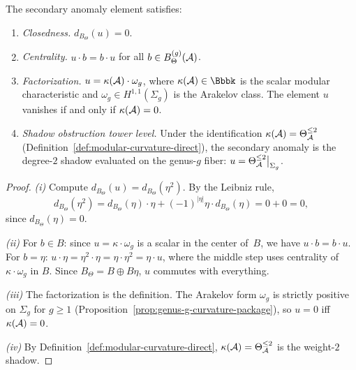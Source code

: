 \begin{proposition}
\label{prop:secondary-anomaly-properties}
The secondary anomaly element satisfies:
\begin{enumerate}[label=\textup{(\roman*)}]
\item \emph{Closedness.}\; $d_{B_\Theta}(u) = 0$.

\item \emph{Centrality.}\; $u \cdot b = b \cdot u$ for all $b \in
B_\Theta^{(g)}(\mathcal{A})$.

\item \emph{Factorization.}\; $u = \kappa(\mathcal{A}) \cdot \omega_g$, where
$\kappa(\cA) \in \Bbbk$ is the scalar modular characteristic and
$\omega_g \in H^{1,1}(\Sigma_g)$ is the Arakelov class. The element
$u$ vanishes if and only if $\kappa(\mathcal{A}) = 0$.

\item \emph{Shadow obstruction tower level.}\; Under the identification
$\kappa(\mathcal{A}) = \Theta_{\mathcal{A}}^{\leq 2}$
(Definition~\ref{def:modular-curvature-direct}), the
secondary anomaly is the degree-$2$ shadow evaluated on the genus-$g$
fiber: $u = \Theta_{\mathcal{A}}^{\leq 2}\big|_{\Sigma_g}$.
\end{enumerate}
\end{proposition}

\begin{proof}
\emph{(i)} Compute $d_{B_\Theta}(u) = d_{B_\Theta}(\eta^2)$. By the
Leibniz rule,
\[
d_{B_\Theta}(\eta^2) = d_{B_\Theta}(\eta) \cdot \eta
+ (-1)^{|\eta|}\eta \cdot d_{B_\Theta}(\eta) = 0 + 0 = 0,
\]
since $d_{B_\Theta}(\eta) = 0$.

\emph{(ii)} For $b \in B$: since $u = \kappa \cdot \omega_g$ is a
scalar in the center of~$B$, we have $u \cdot b = b \cdot u$. For
$b = \eta$: $u \cdot \eta = \eta^2 \cdot \eta = \eta \cdot \eta^2 =
\eta \cdot u$, where the middle step uses centrality of
$\kappa \cdot \omega_g$ in $B$. Since $B_\Theta = B \oplus B\eta$,
$u$ commutes with everything.

\emph{(iii)} The factorization is the definition. The Arakelov form
$\omega_g$ is strictly positive on $\Sigma_g$ for $g \geq 1$
(Proposition~\ref{prop:genus-g-curvature-package}), so $u = 0$
iff $\kappa(\mathcal{A}) = 0$.

\emph{(iv)} By Definition~\ref{def:modular-curvature-direct},
$\kappa(\mathcal{A}) = \Theta_{\mathcal{A}}^{\leq 2}$ is the weight-$2$ shadow.
\end{proof}

